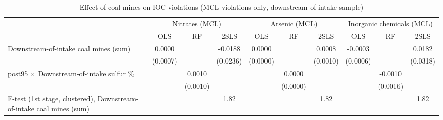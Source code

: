 
\begin{table}[htbp]
   
   \caption{\label{2sls_placebo_dwnstrmintake_minevio_mcl_ivsum_binvio} Effect of coal mines on IOC violations (MCL violations only, downstream-of-intake sample)}
   \bigskip
   
   \centering
   
   \begin{adjustbox}{width = \textwidth, center}
      
      
      \begin{tabular}{lccccccccc}
         \toprule
         
          & \multicolumn{3}{c}{Nitrates (MCL)} & \multicolumn{3}{c}{Arsenic (MCL)} & \multicolumn{3}{c}{Inorganic chemicals (MCL)}\\
         
                                                                              & OLS           & RF            & 2SLS          & OLS           & RF            & 2SLS          & OLS           & RF            & 2SLS\\  
         
         \midrule 
         Downstream-of-intake coal mines (sum)                                & 0.0000        &               & -0.0188       & 0.0000        &               & 0.0008        & -0.0003       &               & 0.0182\\   
                                                                              & (0.0007)      &               & (0.0236)      & (0.0000)      &               & (0.0010)      & (0.0006)      &               & (0.0318)\\   
         post95 $\times$ Downstream-of-intake sulfur \%                       &               & 0.0010        &               &               & 0.0000        &               &               & -0.0010       &   \\   
                                                                              &               & (0.0010)      &               &               & (0.0000)      &               &               & (0.0016)      &   \\   
         
         F-test (1st stage, clustered), Downstream-of-intake coal mines (sum) &               &               & 1.82          &               &               & 1.82          &               &               & 1.82\\  
         

\end{tabular}
\end{adjustbox}
\end{table}
